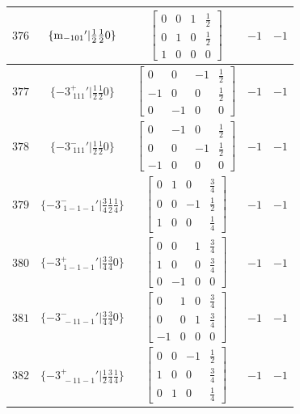 \documentclass[fleqn,8pt]{jsarticle}
\begin{document}
\begin{longtable}{ccccc}
$ 376 $ & $ \{{\rm m}_{-101}{}'|\frac{1}{2} \frac{1}{2} 0\} $ & $ \begin{bmatrix} 0 & 0 & 1 & \frac{1}{2} \\ 0 & 1 & 0 & \frac{1}{2} \\ 1 & 0 & 0 & 0 \end{bmatrix} $ & $ -1 $ & $ -1 $ \\ \hline
$ 377 $ & $ \{-3^{+}_{\,\,111}{}'|\frac{1}{2} \frac{1}{2} 0\} $ & $ \begin{bmatrix} 0 & 0 & -1 & \frac{1}{2} \\ -1 & 0 & 0 & \frac{1}{2} \\ 0 & -1 & 0 & 0 \end{bmatrix} $ & $ -1 $ & $ -1 $ \\ \hline
$ 378 $ & $ \{-3^{-}_{\,\,111}{}'|\frac{1}{2} \frac{1}{2} 0\} $ & $ \begin{bmatrix} 0 & -1 & 0 & \frac{1}{2} \\ 0 & 0 & -1 & \frac{1}{2} \\ -1 & 0 & 0 & 0 \end{bmatrix} $ & $ -1 $ & $ -1 $ \\ \hline
$ 379 $ & $ \{-3^{-}_{\,\,1-1-1}{}'|\frac{3}{4} \frac{1}{2} \frac{1}{4}\} $ & $ \begin{bmatrix} 0 & 1 & 0 & \frac{3}{4} \\ 0 & 0 & -1 & \frac{1}{2} \\ 1 & 0 & 0 & \frac{1}{4} \end{bmatrix} $ & $ -1 $ & $ -1 $ \\ \hline
$ 380 $ & $ \{-3^{+}_{\,\,1-1-1}{}'|\frac{3}{4} \frac{3}{4} 0\} $ & $ \begin{bmatrix} 0 & 0 & 1 & \frac{3}{4} \\ 1 & 0 & 0 & \frac{3}{4} \\ 0 & -1 & 0 & 0 \end{bmatrix} $ & $ -1 $ & $ -1 $ \\ \hline
$ 381 $ & $ \{-3^{-}_{\,\,-11-1}{}'|\frac{3}{4} \frac{3}{4} 0\} $ & $ \begin{bmatrix} 0 & 1 & 0 & \frac{3}{4} \\ 0 & 0 & 1 & \frac{3}{4} \\ -1 & 0 & 0 & 0 \end{bmatrix} $ & $ -1 $ & $ -1 $ \\ \hline
$ 382 $ & $ \{-3^{+}_{\,\,-11-1}{}'|\frac{1}{2} \frac{3}{4} \frac{1}{4}\} $ & $ \begin{bmatrix} 0 & 0 & -1 & \frac{1}{2} \\ 1 & 0 & 0 & \frac{3}{4} \\ 0 & 1 & 0 & \frac{1}{4} \end{bmatrix} $ & $ -1 $ & $ -1 $ \\ \hline

\end{longtable}
\end{document}
